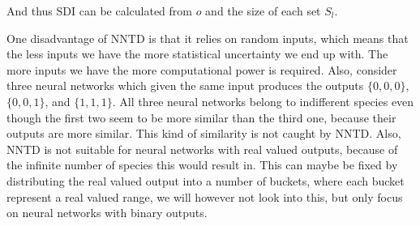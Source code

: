 And thus SDI can be calculated from $o$ and the size of each set $S_l$.

One disadvantage of NNTD is that it relies on random inputs, which means that the less inputs we have the more statistical uncertainty we end up with. The more inputs we have the more computational power is required. Also, consider three neural networks which given the same input produces the outputs $\{0, 0, 0\}$, $\{0, 0, 1\}$, and $\{1, 1, 1\}$. All three neural networks belong to indifferent species even though the first two seem to be more similar than the third one, because their outputs are more similar. This kind of similarity is not caught by NNTD. Also, NNTD is not suitable for neural networks with real valued outputs, because of the infinite number of species this would result in. This can maybe be fixed by distributing the real valued output into a number of buckets, where each bucket represent a real valued range, we will however not look into this, but only focus on neural networks with binary outputs.

